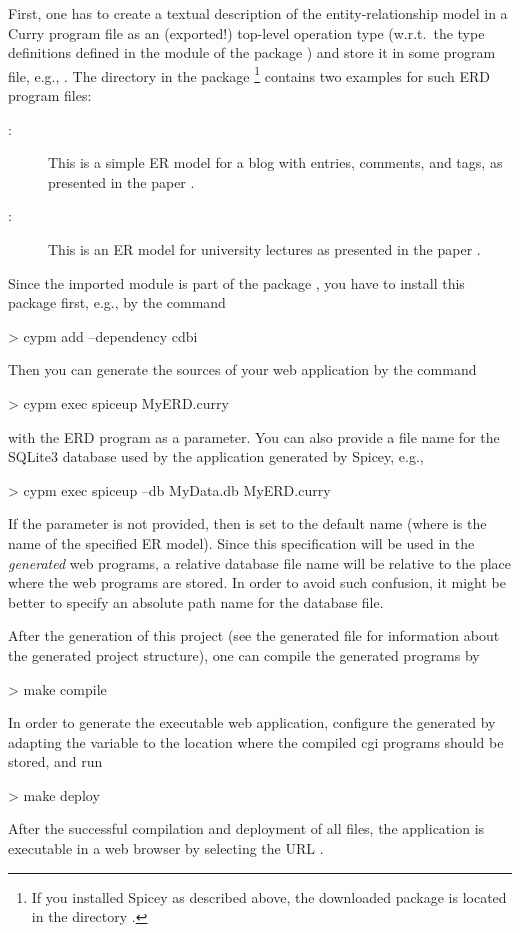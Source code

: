 First, one has to create a textual description of the
entity-relationship model
in a Curry program file as an (exported!) top-level operation type 
(w.r.t.\ the type definitions defined in the module 
of the package )
and store it in some program file, e.g., .
The directory  in the package \footnote{%
If you installed Spicey as described above,
the downloaded  package is located in the directory
.}
contains two examples for such ERD program files:
\begin{description}
\item[:]
This is a simple ER model for a blog with entries, comments,
and tags, as presented in the paper \cite{HanusKoschnicke14TPLP}.
\item[:]
This is an ER model for university lectures as
presented in the paper \cite{BrasselHanusMueller08PADL}.
\end{description}
%
Since the imported module  is part of the package
, you have to install this package first, e.g., by the command
\begin{curry}
> cypm add --dependency cdbi
\end{curry}
Then you can generate the sources of your web application
by the command
\begin{curry}
> cypm exec spiceup MyERD.curry
\end{curry}
with the ERD program as a parameter.
You can also provide a file name for the SQLite3 database used
by the application generated by Spicey, e.g.,
\begin{curry}
> cypm exec spiceup --db MyData.db MyERD.curry
\end{curry}
If the parameter  is not provided,
then  is set to the default name 
(where  is the name of the specified ER model).
Since this specification will be used in the \emph{generated} web programs,
a relative database file name will be relative to the place where
the web programs are stored.
In order to avoid such confusion, it might be better to specify
an absolute path name for the database file.

After the generation of this project (see the generated file
 for information about the generated project structure),
one can compile the generated programs by
\begin{curry}
> make compile
\end{curry}
In order to generate the executable web application,
configure the generated 
by adapting the variable  to the location
where the compiled cgi programs should be stored, and run
\begin{curry}
> make deploy
\end{curry}
After the successful compilation and deployment of all files,
the application is executable
in a web browser by selecting the URL .


